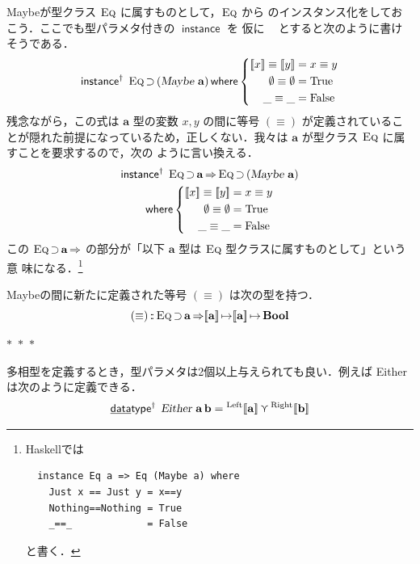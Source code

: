 \documentclass[a5paper,twoside,fleqn,draft]{jsbook}
\def\[{[\![}
\def\]{]\!]}
\newcommand{\separator}{\begin{center}$*$~$*$~$*$\end{center}}
\newcommand{\programminglanguage}[1]{\textsf{#1}}
\newcommand{\haskell}{\programminglanguage{Haskell}}
\newcommand{\mKeyword}[1]{\mathsf{#1}}
\newcommand{\mKeywordUnderline}[1]{\text{\underline{\textsf{#1}}}}
\newcommand{\mDataTypeKeyword}{\mKeywordUnderline{data}\mKeyword{type}}
\newcommand{\mInstanceDeclKeyword}{\mKeyword{instance}}
\newcommand{\mWhereKeyword}{\mKeyword{where}}
\DeclareMathOperator{\mDataTypePolymorphic}{\mDataTypeKeyword^\dagger}
\DeclareMathOperator{\mInstanceDecl}{\mInstanceDeclKeyword}
\DeclareMathOperator{\mInstanceDeclPolymorphic}{\mInstanceDeclKeyword^{\dagger}}
\DeclareMathOperator{\mSuperClass}{\Rightarrow}
\DeclareMathOperator{\mSuperSet}{\supset}
\DeclareMathOperator{\mWhere}{\mWhereKeyword}
\newcommand{\mSpecialConstant}[1]{\textrm{#1}}
\newcommand{\mFalse}{\mSpecialConstant{False}}
\newcommand{\mNothing}{\emptyset}
\newcommand{\mTrue}{\mSpecialConstant{True}}
\DeclareMathOperator{\mIn}{{:\!:}}
\DeclareMathOperator{\mMapsTo}{\mapsto}
\DeclareMathOperator{\mValueOr}{\curlyvee}
\newcommand{\mType}[1]{\mathbf{#1}} %
\newcommand{\mA}{\mType{a}}
\newcommand{\mB}{\mType{b}}
\newcommand{\mBoolType}{\mType{Bool}}
\newcommand{\mTypeAssemble}[2]{{}^{\mType{#1}}\[\mType{#2}\]}
\newcommand{\mMaybeType}[1]{\[\mType{#1}\]}%
\newcommand{\mTypeConstructor}[1]{\textsl{#1}}
\DeclareMathOperator{\mEitherTypeConstructor}{\mTypeConstructor{Either}}
\DeclareMathOperator{\mMaybeTypeConstructor}{\mTypeConstructor{Maybe}}
\newcommand{\mValueConstructor}[1]{\mathrm{#1}}
\newcommand{\mValueWith}[2]{{}^\mValueConstructor{#1}\[#2\]}
\newcommand{\mLeftWith}[1]{\mValueWith{Left}{#1}}
\newcommand{\mRightWith}[1]{\mValueWith{Right}{#1}}
\newcommand{\mJustWith}[1]{\[#1\]}%
\newcommand{\mTypeClass}[1]{\textsc{#1}} %
\newcommand{\mEqTypeClass}{\mTypeClass{Eq}}
\newcommand{\mProjEXP}[2]{#1\mMapsTo#2} %
\begin{document}
Maybeが型クラス $\mEqTypeClass$ に属すものとして，$\mEqTypeClass$ から
のインスタンス化をしておこう．ここでも型パラメタ付きの $\mInstanceDecl$ を
仮に $\mInstanceDeclPolymorphic$ とすると次のように書けそうである．
\begin{equation}
  \mInstanceDeclPolymorphic\;
  \mEqTypeClass\mSuperSet{}(\mMaybeTypeConstructor\,\mA)
  \mWhere
  \left\{
  \begin{aligned}
    \mJustWith{x}\equiv\mJustWith{y}
    &=x\equiv y\\
    \mNothing\equiv\mNothing
    &=\mTrue\\
    \_\equiv\_
    &=\mFalse
  \end{aligned}
  \right.
\end{equation}
残念ながら，この式は $\mA $ 型の変数 $x,y$ の間に等号 $(\equiv)$
が定義されていることが隠れた前提になっているため，正しくない．我々は
$\mA $ が型クラス $\mEqTypeClass$ に属すことを要求するので，次の
ように言い換える．
\begin{multline}
\mInstanceDeclPolymorphic\;
\mEqTypeClass\mSuperSet\mA
\mSuperClass
\mEqTypeClass\mSuperSet{}(\mMaybeTypeConstructor\,\mA )\\
\mWhere
\left\{
\begin{aligned}
\mJustWith{x}\equiv\mJustWith{y}&=x\equiv y\\
\mNothing\equiv\mNothing&=\mTrue\\
\_\equiv\_&=\mFalse
\end{aligned}
\right.
\end{multline}
この $\mEqTypeClass\mSuperSet\mA \mSuperClass$ の部分が「以下
$\mA $ 型は $\mEqTypeClass$ 型クラスに属すものとして」という意
味になる．\footnote{\haskell では
\begin{verbatim}
  instance Eq a => Eq (Maybe a) where
    Just x == Just y = x==y
    Nothing==Nothing = True
    _==_             = False
\end{verbatim}
と書く．
}

Maybeの間に新たに定義された等号 $(\equiv)$ は次の型を持つ．
\begin{equation}
(\equiv)
\mIn{}\mEqTypeClass\mSuperSet\mA
\mSuperClass\mProjEXP{\mMaybeType{a}}{\mProjEXP{\mMaybeType{a}}{\mBoolType}}
\end{equation}

\separator

多相型を定義するとき，型パラメタは2個以上与えられても良い．例えば
Eitherは次のように定義できる．
\begin{equation}
\mDataTypePolymorphic\;\mEitherTypeConstructor\,\mA \,\mB
=\mLeftWith{\mA }
\mValueOr
\mRightWith{\mB }
\end{equation}
\end{document}

